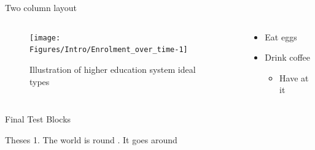 \documentclass[
  ignorenonframetext,
]{beamer}
\providecommand{\tightlist}{%
  \setlength{\itemsep}{0pt}\setlength{\parskip}{0pt}}
\begin{document}
\begin{frame}{Two column layout}
\protect\hypertarget{two-column-layout}{}
\footnotesize

\begin{columns}[T]
\begin{column}{0.48\textwidth}
\begin{figure}
\texttt{[image: Figures/Intro/Enrolment\_over\_time-1]} \caption{Illustration of higher education system ideal types}\label{fig:unnamed-chunk-12}
\end{figure}
\end{column}

\begin{column}{0.48\textwidth}
\begin{itemize}[<+->]
\tightlist
\item
  Eat eggs
\item
  Drink coffee

  \begin{itemize}[<+->]
  \tightlist
  \item
    Have at it
  \end{itemize}
\end{itemize}
\end{column}
\end{columns}
\end{frame}

\begin{frame}{Final Test}
\protect\hypertarget{final-test}{}
Blocks

\begin{alertblock}{Theses}
1. The world is round . It goes around
\end{alertblock}
\end{frame}
\end{document}
